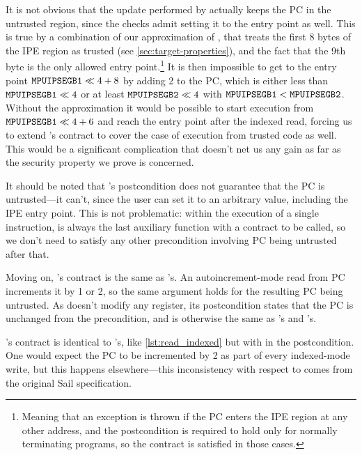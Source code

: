 It is not obvious that the update performed by  actually keeps the PC in the untrusted region, since the checks admit setting it to the entry point as well. This is true by a combination of our approximation of , that treats the first 8 bytes of the IPE region as trusted (see \cref{sec:target-properties}), and the fact that the 9th byte is the only allowed entry point.\footnote{Meaning that an exception is thrown if the PC enters the IPE region at any other address, and the postcondition is required to hold only for normally terminating programs, so the contract is satisfied in those cases.} It is then impossible to get to the entry point \(\reg{MPUIPSEGB1} \ll 4 + 8\) by adding 2 to the PC, which is either less than \(\reg{MPUIPSEGB1} \ll 4\) or at least \(\reg{MPUIPSEGB2} \ll 4\) with \(\reg{MPUIPSEGB1} < \reg{MPUIPSEGB2}\). Without the approximation it would be possible to start execution from \(\reg{MPUIPSEGB1} \ll 4 + 6\) and reach the entry point after the indexed read, forcing us to extend 's contract to cover the case of execution from trusted code as well. This would be a significant complication that doesn't net us any gain as far as the security property we prove is concerned.

It should be noted that 's postcondition does not guarantee that the PC is untrusted---it can't, since the user can set it to an arbitrary value, including the IPE entry point. This is not problematic: within the execution of a single instruction,  is always the last auxiliary function with a contract to be called, so we don't need to satisfy any other precondition involving PC being untrusted after that.

Moving on, 's contract is the same as 's. An auto\-increment-\-mode read from PC increments it by 1 or 2, so the same argument holds for the resulting PC being untrusted. As  doesn't modify any register, its postcondition states that the PC is unchanged from the precondition, and is otherwise the same as 's and 's.

's contract is identical to 's, \ie like \cref{lst:read_indexed} but with  in the postcondition. One would expect the PC to be incremented by 2 as part of every indexed-mode write, but this happens elsewhere---this inconsistency with respect to  comes from the original Sail specification.

